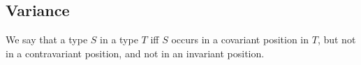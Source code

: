 \documentclass[makeidx]{article}
\begin{document}












\subsection{Variance}

\LMHash{}%
We say that a type $S$  in a type $T$ if{}f
$S$ occurs in a covariant position in $T$,
but not in a contravariant position,
and not in an invariant position.
\end{document}

